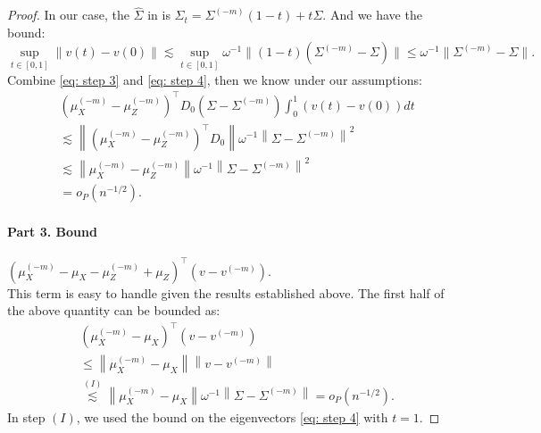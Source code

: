 \documentclass[11pt]{article}
\begin{document}
\begin{proof}
In our case, the $\mathbb{\hat\Sigma}$ in  is $\Sigma_t=\Sigma^{(-m)}(1-t)+t \Sigma$. And we have the bound:
\begin{equation}\label{eq: step 4}
    \sup _{t \in[0,1]}\|v(t)-v(0)\| \lesssim \sup_{t \in [0,1]}\omega^{-1}\|(1-t)(\Sigma^{(-m)}-\Sigma)\| \leq \omega^{-1} \|\Sigma^{(-m)}-\Sigma\|.
\end{equation}
Combine \eqref{eq: step 3} and \eqref{eq: step 4}, then we know under our assumptions:
\begin{equation}\label{eq: conclusion part 2}
\begin{aligned}
  &\left(\mu_X^{(-m)}-\mu_Z^{(-m)}\right)^{\top} D_0\left(\Sigma-\Sigma^{(-m)}\right) \int_0^1(v(t)-v(0)) d t\\
  &\lesssim 
\left\|\left(\mu_X^{(-m)}-\mu_Z^{(-m)}\right)^{\top} D_0\right\|\omega^{-1}\left\|\Sigma-\Sigma^{(-m)}\right\|^2\\
& \lesssim \left\|\mu_X^{(-m)}-\mu_Z^{(-m)}\right\|\omega^{-1}\left\|\Sigma-\Sigma^{(-m)}\right\|^2\\
& = o_P(n^{-1/2}).  
\end{aligned}
\end{equation}

\paragraph{Part 3. Bound} $\left(\mu_X^{(-m)}-\mu_X-\mu_Z^{(-m)}+\mu_Z\right)^{\top}\left(v-v^{(-m)}\right)$.\\
This term is easy to handle given the results established above. The first half of the above quantity can be bounded as:
\begin{equation*}
\begin{aligned}
    &\left(\mu_X^{(-m)}-\mu_X\right)^{\top}\left(v-v^{(-m)}\right)\\
    & \leq \left\|\mu_X^{(-m)}-\mu_X\right\|\left\|v-v^{(-m)}\right\|\\
    & \stackrel{(I)}{\lesssim} \left\|\mu_X^{(-m)}-\mu_X\right\| \omega^{-1}\left\|\Sigma-\Sigma^{(-m)}\right\| = o_P(n^{-1/2}).
\end{aligned}
\end{equation*}
In step $(I)$, we used the bound on the eigenvectors \eqref{eq: step 4} with $t = 1$.
\end{proof}
\end{document}
